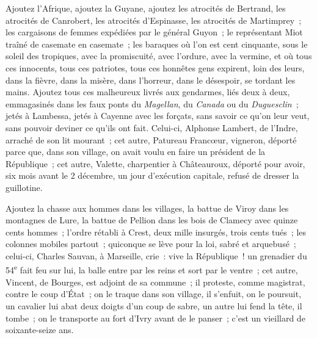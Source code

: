 \documentclass[french,twoside]{book} %
\begin{document}
Ajoutez l’Afrique, ajoutez la Guyane, ajoutez les atrocités de Bertrand, les atrocités de Canrobert, les atrocités d’Espinasse, les atrocités de Martimprey ; les cargaisons de femmes expédiées par le général Guyon ; le représentant Miot traîné de casemate en casemate ; les baraques où l’on est cent cinquante, sous le soleil des tropiques, avec la promiscuité, avec l’ordure, avec la vermine, et où tous ces innocents, tous ces patriotes, tous ces honnêtes gens expirent, loin des leurs, dans la fièvre, dans la misère, dans l’horreur, dans le désespoir, se tordant les mains. Ajoutez tous ces malheureux livrés aux gendarmes, liés deux à deux, emmagasinés dans les faux ponts du \emph{Magellan}, du \emph{Canada} ou du \emph{Duguesclin} ; jetés à Lambessa, jetés à Cayenne avec les forçats, sans savoir ce qu’on leur veut, sans pouvoir deviner ce qu’ils ont fait. Celui-ci, Alphonse Lambert, de l’Indre, arraché de son lit mourant ; cet autre, Patureau Francœur, vigneron, déporté parce que, dans son village, on avait voulu en faire un président de la République ; cet autre, Valette, charpentier à Châteauroux, déporté pour avoir, six mois avant le 2 décembre, un jour d’exécution capitale, refusé de dresser la guillotine.\par
Ajoutez la chasse aux hommes dans les villages, la battue de Viroy dans les montagnes de Lure, la battue de Pellion dans les bois de Clamecy avec quinze cents hommes ; l’ordre rétabli à Crest, deux mille insurgés, trois cents tués ; les colonnes mobiles partout ; quiconque se lève pour la loi, sabré et arquebusé ; celui-ci, Charles Sauvan, à Marseille, crie : vive la République ! un grenadier du 54\textsuperscript{e} fait feu sur lui, la balle entre par les reins et sort par le ventre ; cet autre, Vincent, de Bourges, est adjoint de sa commune ; il proteste, comme magistrat, contre le coup d’État ; on le traque dans son village, il s’enfuit, on le poursuit, un cavalier lui abat deux doigts d’un coup de sabre, un autre lui fend la tête, il tombe ; on le transporte au fort d’Ivry avant de le panser ; c’est un vieillard de soixante-seize ans.\par
\end{document}

